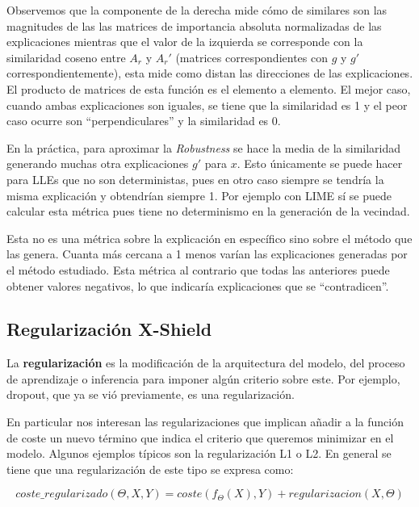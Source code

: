Observemos que la componente de la derecha mide cómo de similares son las magnitudes de las las matrices de importancia absoluta normalizadas de las explicaciones mientras que el valor de la izquierda se corresponde con la similaridad coseno entre $A_r$ y $A_r'$ (matrices correspondientes con $g$ y $g'$ correspondientemente), esta mide como distan las direcciones de las explicaciones. El producto de matrices de esta función es el elemento a elemento. El mejor caso, cuando ambas explicaciones son iguales, se tiene que la similaridad es 1 y el peor caso ocurre son ``perpendiculares'' y la similaridad es 0. 

En la práctica, para aproximar la \textit{Robustness} se hace la media de la similaridad generando muchas otra explicaciones $g'$ para $x$. Esto únicamente se puede hacer para LLEs que no son deterministas, pues en otro caso siempre se tendría la misma explicación y obtendrían siempre 1. Por ejemplo con LIME sí se puede calcular esta métrica pues tiene no determinismo en la generación de la vecindad.


Esta no es una métrica sobre la explicación en específico sino sobre el método que las genera. Cuanta más cercana a 1 menos varían las explicaciones generadas por el método estudiado. Esta métrica al contrario que todas las anteriores puede obtener valores negativos, lo que indicaría explicaciones que se ``contradicen''.

\subsection{Regularización X-Shield} \label{subsec:XSHIELD}

La \textbf{regularización} \cite{XSHIELD, Regularization} es la modificación de la arquitectura del modelo, del proceso de aprendizaje o inferencia para imponer algún criterio sobre este. Por ejemplo, dropout, que ya se vió previamente, es una regularización. 

En particular nos interesan las regularizaciones que implican añadir a la función de coste un nuevo término que indica el criterio que queremos minimizar en el modelo. Algunos ejemplos típicos son la regularización L1 o L2. En general se tiene que una regularización de este tipo se expresa como:

\begin{equation}
coste\_regularizado(\Theta, X, Y) = coste(f_\Theta (X), Y) + regularizacion(X,\Theta )
\end{equation}

